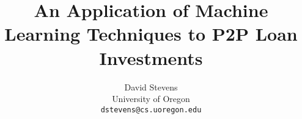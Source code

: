 \documentclass[conference,10pt]{IEEEtran}
\date{}
\begin{document}
\setcounter{page}{1}
\pagestyle{plain}

\title{An Application of Machine Learning Techniques to P2P Loan Investments}
\author{
{David Stevens}\\
University of Oregon\\
\texttt{dstevens@cs.uoregon.edu}
}

\maketitle







\end{document}
